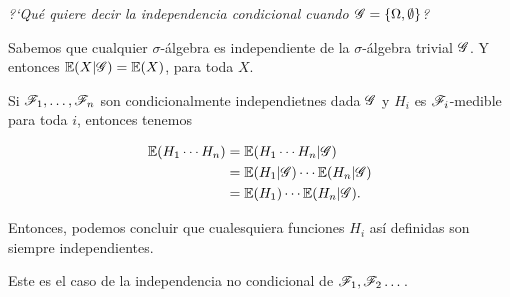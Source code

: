 ﻿\emph{
	?`Qu\'e quiere decir la independencia condicional cuando $\mathscr{G}=\left\{  \Omega ,\emptyset\right\} $?
}
\afterstatement\par\null

Sabemos que cualquier $\sigma$-álgebra es
independiente de la $\sigma$-álgebra trivial $\mathscr{G}$. Y entonces $\mathbb{E}(X | \mathscr{G}) = \mathbb{E}(X)$, para toda $X$.\par\null

Si $\mathscr{F}_1, \dots, \mathscr{F}_n$ son condicionalmente independietnes dada $\mathscr{G}$ y $H_i$ es $\mathscr{F}_i$-medible para toda $i$, entonces tenemos

\begin{align}
    \mathbb{E}(H_1 \cdots H_n) &=  \mathbb{E}(H_1 \cdots H_n | \mathscr{G})            \\
                        &=  \mathbb{E}(H_1 | \mathscr{G}) \cdots \mathbb{E}(H_n | \mathscr{G})    \\
                        &=  \mathbb{E}(H_1) \cdots  \mathbb{E}(H_n | \mathscr{G}).
\end{align}

Entonces, podemos concluir que cualesquiera funciones $H_i$ así definidas son siempre
independientes.\par\null

Este es el caso de la independencia no condicional de $\mathscr{F}_1, \mathscr{F}_2\dots$.